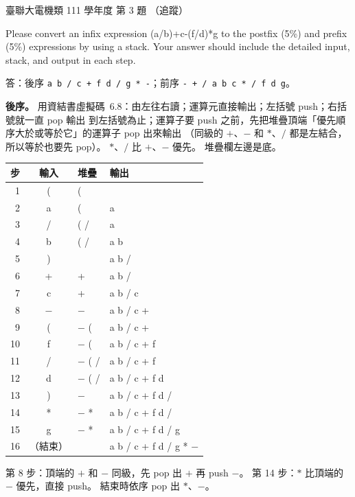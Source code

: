 \begin{pastexam}[label={px:ust-111-ee-ds-03}]{臺聯大電機類 111 學年度 第 3 題}
（追蹤）

Please convert an infix expression (a/b)+c-(f/d)*g to the postfix (5\%) and prefix (5\%) expressions
by using a stack. Your answer should include the detailed input, stack, and output in each step.
\end{pastexam}

\begin{pastsoln}
答：後序 \texttt{a b / c + f d / g * -}；前序 \texttt{- + / a b c * / f d g}。

\textbf{後序。} 用資結書虛擬碼~6.8：由左往右讀；運算元直接輸出；左括號 push；右括號就一直 pop 輸出
到左括號為止；運算子要 push 之前，先把堆疊頂端「優先順序大於或等於它」的運算子 pop 出來輸出
（同級的 $+$、$-$ 和 $*$、$/$ 都是左結合，所以等於也要先 pop）。 $*$、$/$ 比 $+$、$-$ 優先。
堆疊欄左邊是底。
\begin{center}
\small
\begin{tabular}{rcll}
\toprule
步 & 輸入 & 堆疊 & 輸出 \\
\midrule
1 & ( & ( & \\
2 & a & ( & a \\
3 & / & ( / & a \\
4 & b & ( / & a b \\
5 & ) & & a b / \\
6 & + & + & a b / \\
7 & c & + & a b / c \\
8 & $-$ & $-$ & a b / c + \\
9 & ( & $-$ ( & a b / c + \\
10 & f & $-$ ( & a b / c + f \\
11 & / & $-$ ( / & a b / c + f \\
12 & d & $-$ ( / & a b / c + f d \\
13 & ) & $-$ & a b / c + f d / \\
14 & * & $-$ * & a b / c + f d / \\
15 & g & $-$ * & a b / c + f d / g \\
16 & （結束） & & a b / c + f d / g * $-$ \\
\bottomrule
\end{tabular}
\end{center}
第 8 步：頂端的 $+$ 和 $-$ 同級，先 pop 出 $+$ 再 push $-$。 第 14 步：$*$ 比頂端的 $-$ 優先，直接
push。 結束時依序 pop 出 $*$、$-$。


\end{pastsoln}
